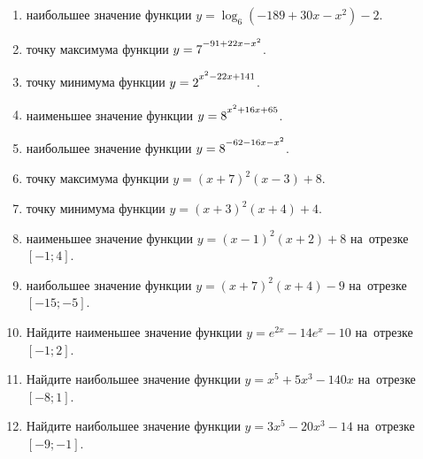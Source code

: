 \documentclass[a4paper,10pt]{article}
\begin{document}
\begin{enumerate}
\item {} наибольшее значение функции $y=\log_6\left(-189+30x-x^2\right)-2$.

\item {} точку максимума функции $y=7\strut^{-91+22x-x^2}$.

\item {} точку минимума функции $y=2\strut^{x^2-22x+141}$.

\item {} наименьшее значение функции $y=8\strut^{x^2+16x+65}$.

\item {} наибольшее значение функции $y=8\strut^{-62-16x-x^2}$.

\item {} точку максимума функции $y=\left(x+7\right)^2\left(x-3\right)+8$.

\item {} точку минимума функции $y=\left(x+3\right)^2\left(x+4\right)+4$.

\item {} наименьшее значение функции $y=\left(x-1\right)^2\left(x+2\right)+8$ на~отрезке~$\left[-1;4\right]$.

\item {} наибольшее значение функции $y=\left(x+7\right)^2\left(x+4\right)-9$ на~отрезке~$\left[-15;-5\right]$.

\item Найдите наименьшее значение функции $y=e^{2x}-14e^x-10$ на~отрезке~$\left[-1;2\right]$.

\item Найдите наибольшее значение функции $y=x^5+5x^3-140x$ на~отрезке~$\left[-8;1\right]$.

\item Найдите наибольшее значение функции $y=3x^5-20x^3-14$ на~отрезке~$\left[-9;-1\right]$.

\end{enumerate}
\end{document}
